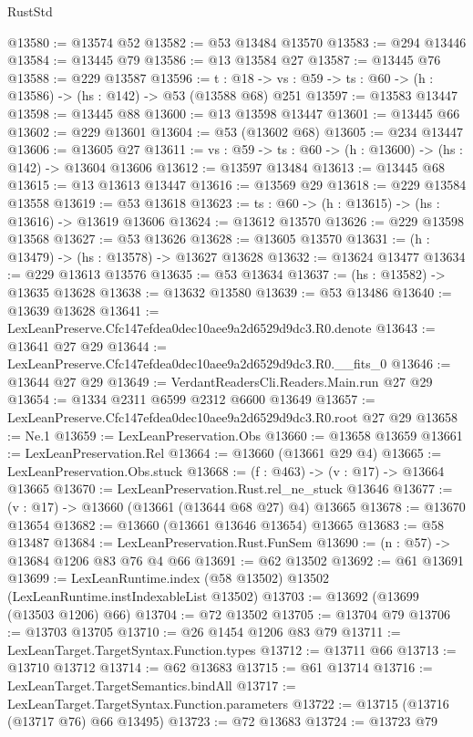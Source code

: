 \begin{lexlean}{RustStd}
\begin{coremodule}
@13580 := @13574 @52
@13582 := @53 @13484 @13570
@13583 := @294 @13446
@13584 := @13445 @79
@13586 := @13 @13584 @27
@13587 := @13445 @76
@13588 := @229 @13587
@13596 := {t : @18} ->
  {vs : @59} -> {ts : @60} -> (h : @13586) -> (hs : @142) -> @53 (@13588 @68) @251
@13597 := @13583 @13447
@13598 := @13445 @88
@13600 := @13 @13598 @13447
@13601 := @13445 @66
@13602 := @229 @13601
@13604 := @53 (@13602 @68)
@13605 := @234 @13447
@13606 := @13605 @27
@13611 := {vs : @59} -> {ts : @60} -> (h : @13600) -> (hs : @142) -> @13604 @13606
@13612 := @13597 @13484
@13613 := @13445 @68
@13615 := @13 @13613 @13447
@13616 := @13569 @29
@13618 := @229 @13584 @13558
@13619 := @53 @13618
@13623 := {ts : @60} -> (h : @13615) -> (hs : @13616) -> @13619 @13606
@13624 := @13612 @13570
@13626 := @229 @13598 @13568
@13627 := @53 @13626
@13628 := @13605 @13570
@13631 := (h : @13479) -> (hs : @13578) -> @13627 @13628
@13632 := @13624 @13477
@13634 := @229 @13613 @13576
@13635 := @53 @13634
@13637 := (hs : @13582) -> @13635 @13628
@13638 := @13632 @13580
@13639 := @53 @13486
@13640 := @13639 @13628
@13641 := LexLeanPreserve.Cfc147efdea0dec10aee9a2d6529d9dc3.R0.denote
@13643 := @13641 @27 @29
@13644 := LexLeanPreserve.Cfc147efdea0dec10aee9a2d6529d9dc3.R0.__fits_0
@13646 := @13644 @27 @29
@13649 := VerdantReadersCli.Readers.Main.run @27 @29
@13654 := @1334 @2311 @6599 @2312 @6600 @13649
@13657 := LexLeanPreserve.Cfc147efdea0dec10aee9a2d6529d9dc3.R0.root @27 @29
@13658 := Ne.{1}
@13659 := LexLeanPreservation.Obs
@13660 := @13658 @13659
@13661 := LexLeanPreservation.Rel
@13664 := @13660 (@13661 @29 @4)
@13665 := LexLeanPreservation.Obs.stuck
@13668 := (f : @463) -> (v : @17) -> @13664 @13665
@13670 := LexLeanPreservation.Rust.rel_ne_stuck @13646
@13677 := (v : @17) -> @13660 (@13661 (@13644 @68 @27) @4) @13665
@13678 := @13670 @13654
@13682 := @13660 (@13661 @13646 @13654) @13665
@13683 := @58 @13487
@13684 := LexLeanPreservation.Rust.FunSem
@13690 := (n : @57) -> @13684 @1206 @83 @76 @4 @66
@13691 := @62 @13502
@13692 := @61 @13691
@13699 := LexLeanRuntime.index (@58 @13502) @13502 (LexLeanRuntime.instIndexableList @13502)
@13703 := @13692 (@13699 (@13503 @1206) @66)
@13704 := @72 @13502
@13705 := @13704 @79
@13706 := @13703 @13705
@13710 := @26 @1454 @1206 @83 @79
@13711 := LexLeanTarget.TargetSyntax.Function.types
@13712 := @13711 @66
@13713 := @13710 @13712
@13714 := @62 @13683
@13715 := @61 @13714
@13716 := LexLeanTarget.TargetSemantics.bindAll
@13717 := LexLeanTarget.TargetSyntax.Function.parameters
@13722 := @13715 (@13716 (@13717 @76) @66 @13495)
@13723 := @72 @13683
@13724 := @13723 @79

\end{coremodule}
\end{lexlean}
